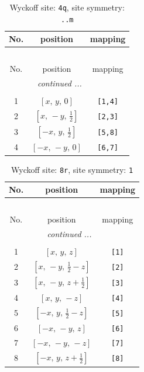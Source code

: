 \documentclass[fleqn,8pt]{jsarticle}
\begin{document}
\renewcommand{\arraystretch}{1.2}
\begin{longtable}{ccc}
\caption{Wyckoff site: {\tt 4q}, site symmetry: {\tt ..m}}
 \\
 \hline \hline
No. & position & mapping \\ \hline \endfirsthead

\multicolumn{2}{l}{\tablename\ \thetable{}} \\
 \hline \hline
No. & position & mapping \\ \hline \endhead

 \hline \hline
\multicolumn{2}{r}{\footnotesize\it continued ...} \\ \endfoot

 \hline \hline
\multicolumn{2}{r}{} \\ \endlastfoot

1 & $\left[ x,\, y,\, 0 \right]$ & {\tt [1,4]} \\ \hline
2 & $\left[ x,\, - y,\, \frac{1}{2} \right]$ & {\tt [2,3]} \\ \hline
3 & $\left[ - x,\, y,\, \frac{1}{2} \right]$ & {\tt [5,8]} \\ \hline
4 & $\left[ - x,\, - y,\, 0 \right]$ & {\tt [6,7]} \\
\end{longtable}
\renewcommand{\arraystretch}{1.2}
\begin{longtable}{ccc}
\caption{Wyckoff site: {\tt 8r}, site symmetry: {\tt 1}}
 \\
 \hline \hline
No. & position & mapping \\ \hline \endfirsthead

\multicolumn{2}{l}{\tablename\ \thetable{}} \\
 \hline \hline
No. & position & mapping \\ \hline \endhead

 \hline \hline
\multicolumn{2}{r}{\footnotesize\it continued ...} \\ \endfoot

 \hline \hline
\multicolumn{2}{r}{} \\ \endlastfoot

1 & $\left[ x,\, y,\, z \right]$ & {\tt [1]} \\ \hline
2 & $\left[ x,\, - y,\, \frac{1}{2} - z \right]$ & {\tt [2]} \\ \hline
3 & $\left[ x,\, - y,\, z + \frac{1}{2} \right]$ & {\tt [3]} \\ \hline
4 & $\left[ x,\, y,\, - z \right]$ & {\tt [4]} \\ \hline
5 & $\left[ - x,\, y,\, \frac{1}{2} - z \right]$ & {\tt [5]} \\ \hline
6 & $\left[ - x,\, - y,\, z \right]$ & {\tt [6]} \\ \hline
7 & $\left[ - x,\, - y,\, - z \right]$ & {\tt [7]} \\ \hline
8 & $\left[ - x,\, y,\, z + \frac{1}{2} \right]$ & {\tt [8]} \\
\end{longtable}
\end{document}
